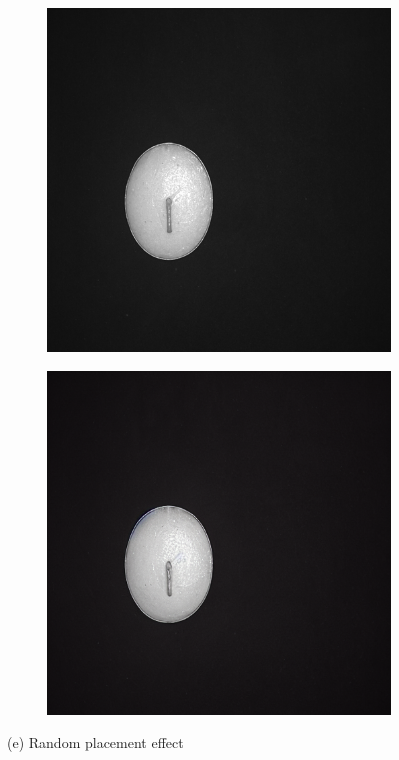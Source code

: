 \documentclass[12pt,DIV14,BCOR12mm,a4paper,footinclude=false,headinclude,parskip=half-,twoside,openright,cleardoublepage=empty,toc=index,bibliography=totoc,listof=totoc]{scrreprt}
\numberwithin{equation}{chapter}
\begin{document}
\begin{figure}
    \vspace{0.3cm} %

    \begin{subfigure}[t]{0.24\textwidth}
        \centering
        \includegraphics[width=\textwidth]{../media/diff_candles_random_real.png}
    \end{subfigure}%
    \hspace{0.02\textwidth}
    \begin{subfigure}[t]{0.24\textwidth}
        \centering
        \includegraphics[width=\textwidth]{../media/diff_candles_random_fake.png}
    \end{subfigure}
    \caption*{(e) Random placement effect}


\end{figure}
\end{document}
